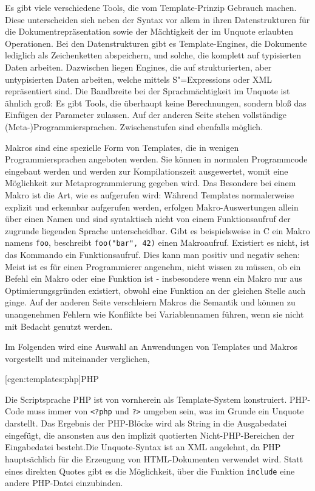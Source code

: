\documentclass[a4paper, bibgerm]{book}
\newcommand\icode[1]{\lstinline?#1?}
\newcommand\phpo{\lstinline+<?php+}
\newcommand\phpc{\lstinline+?>+}
\newcommand\lsubsection{}
\newcommand{\sexps}{S"=Expressions}
\begin{document}
Es gibt viele verschiedene Tools, die vom Template-Prinzip Gebrauch
machen. Diese unterscheiden sich neben der Syntax vor allem in ihren
Datenstrukturen für die Dokumentrepräsentation sowie der Mächtigkeit der
im Unquote erlaubten Operationen. Bei den Datenstrukturen gibt es
Template-Engines, die Dokumente lediglich als Zeichenketten
abspeichern, und solche, die komplett auf typisierten Daten
arbeiten. Dazwischen liegen Engines, die auf strukturierten, aber
untypisierten Daten arbeiten, welche mittels \sexps{} oder XML
repräsentiert sind. Die Bandbreite bei der Sprachmächtigkeit im Unquote
ist ähnlich groß: Es gibt Tools, die überhaupt keine Berechnungen,
sondern bloß das Einfügen der Parameter zulassen. Auf der anderen Seite
stehen vollständige (Meta-)Programmiersprachen. Zwischenstufen sind
ebenfalls möglich.

Makros sind eine spezielle Form von Templates, die in wenigen
Programmiersprachen angeboten werden. Sie können in normalen
Programmcode eingebaut werden und werden zur Kompilationszeit
ausgewertet, womit eine Möglichkeit zur Metaprogrammierung gegeben
wird. Das Besondere bei einem Makro ist die Art, wie es aufgerufen wird:
Während Templates normalerweise explizit und erkennbar aufgerufen
werden, erfolgen Makro-Auswertungen allein über einen Namen und sind
syntaktisch nicht von einem Funktionsaufruf der zugrunde liegenden
Sprache unterscheidbar. Gibt es beispielsweise in C ein Makro namens
\icode{foo}, beschreibt \icode{foo("bar", 42)} einen
Makroaufruf. Existiert es nicht, ist das Kommando ein Funktionsaufruf.
Dies kann man positiv und negativ sehen: Meist ist es für einen
Programmierer angenehm, nicht wissen zu müssen, ob ein Befehl ein Makro
oder eine Funktion ist - insbesondere wenn ein Makro nur aus
Optimierungsgründen existiert, obwohl eine Funktion an der gleichen
Stelle auch ginge. Auf der anderen Seite verschleiern Makros die
Semantik und können zu unangenehmen Fehlern wie Konflikte bei
Variablennamen führen, wenn sie nicht mit Bedacht genutzt werden.

Im Folgenden wird eine Auswahl an Anwendungen von Templates und Makros
vorgestellt und miteinander verglichen,

\lsubsection[cgen:templates:php]{PHP}

Die Scriptsprache PHP ist von vornherein als Template-System
konstruiert. PHP-Code muss immer von \phpo{} und
\phpc{} umgeben sein, was im Grunde ein Unquote darstellt. Das
Ergebnis der PHP-Blöcke wird als String in die Ausgabedatei eingefügt,
die ansonsten aus den implizit quotierten Nicht-PHP-Bereichen der
Eingabedatei besteht.Die Unquote-Syntax ist an
XML angelehnt, da PHP hauptsächlich für die Erzeugung von
HTML-Dokumenten verwendet wird. Statt eines direkten Quotes gibt es die
Möglichkeit, über die Funktion \icode{include} eine andere PHP-Datei
einzubinden.
\end{document}
